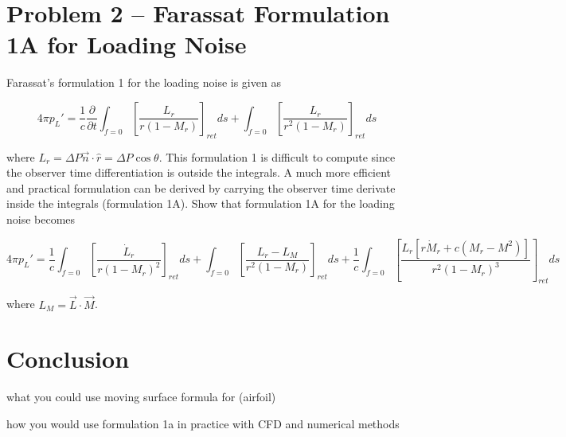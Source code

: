 \documentclass[]{aiaa-tc}%
\begin{document}
\section{Problem 2 -- Farassat Formulation 1A for Loading Noise} \label{SecFarassat}


Farassat’s formulation 1 for the loading noise is given as

\begin{equation} \label{FarassatForm1Loading}
4\pi p_{L}' = \dfrac{1}{c} \dfrac{\partial}{\partial t}
      \int_{f=0} \left[ \dfrac{L_r}{r   (1 - M_r)} \right]_{ret} ds
    + \int_{f=0} \left[ \dfrac{L_r}{r^2 (1 - M_r)} \right]_{ret} ds
\end{equation}


\noindent where $L_r = \Delta P \vec{n} \cdot \hat{r} = \Delta P \cos\theta$. This formulation 1 is difficult to compute since the observer time differentiation is outside the integrals. A much more efficient and practical formulation can be derived by carrying the observer time derivate inside the integrals (formulation 1A). Show that formulation 1A for the loading noise becomes

\begin{equation} \label{FarassatForm1ALoadingEx}
4\pi p_{L}' = \dfrac{1}{c}
      \int_{f=0} \left[ \dfrac{\dot{L}_r}{r (1 - M_r)^2} \right]_{ret} ds
    + \int_{f=0} \left[ \dfrac{L_r - L_M}{r^2 (1 - M_r)} \right]_{ret} ds
+ \dfrac{1}{c} \int_{f=0} \left[
    \dfrac{ L_r[r \dot{M}_r + c(M_r - M^2)] }{r^2 (1 - M_r)^3} \right]_{ret} ds
\end{equation}

\noindent where $L_M = \vec{L} \cdot \vec{M} $.




\section*{Conclusion}

what you could use moving surface formula for (airfoil)

how you would use formulation 1a in practice with CFD and numerical methods
\end{document}
